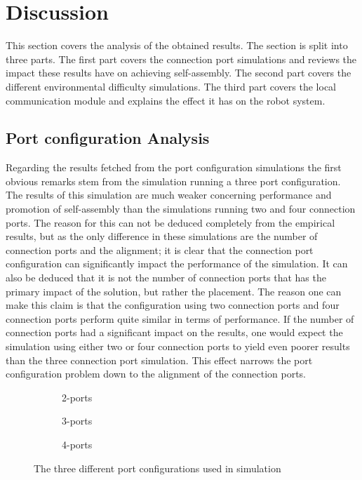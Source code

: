 \section{Discussion}
This section covers the analysis of the obtained results.
The section is split into three parts.
The first part covers the connection port simulations and reviews the impact these results have on achieving self-assembly.
The second part covers the different environmental difficulty simulations.
The third part covers the local communication module and explains the effect it has on the robot system.

\subsection{Port configuration Analysis}
Regarding the results fetched from the port configuration simulations the first obvious remarks stem from the simulation running a three port configuration.
The results of this simulation are much weaker concerning performance and promotion of self-assembly than the simulations running two and four connection ports.
The reason for this can not be deduced completely from the empirical results, but as the only difference in these simulations are the number of connection ports and the alignment; it is clear that the connection port configuration can significantly impact the performance of the simulation.
It can also be deduced that it is not the number of connection ports that has the primary impact of the solution, but rather the placement.
The reason one can make this claim is that the configuration using two connection ports and four connection ports perform quite similar in terms of performance.
If the number of connection ports had a significant impact on the results, one would expect the simulation using either two or four connection ports to yield even poorer results than the three connection port simulation.
This effect narrows the port configuration problem down to the alignment of the connection ports.

\begin{figure}[H]
	\centering
	\begin{subfigure}[b]{0.31\textwidth}
		\centering
		\caption{2-ports}
	\end{subfigure}
	\begin{subfigure}[b]{0.31\textwidth}
		\centering
		\caption{3-ports}
	\end{subfigure}
	\begin{subfigure}[b]{0.31\textwidth}
		\centering
		\caption{4-ports}
	\end{subfigure}
	\caption{The three different port configurations used in simulation}
	\label{fig:robot-port-configuration}
\end{figure}


